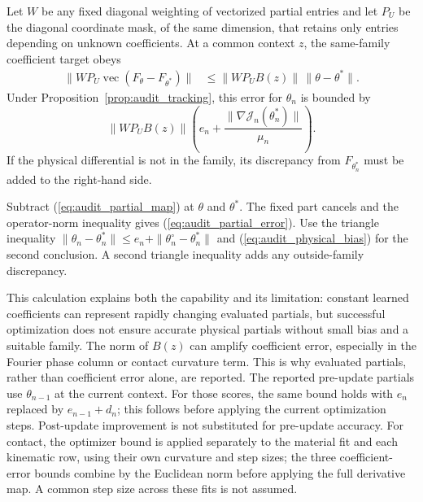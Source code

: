 \begin{auditproposition}
\label{prop:audit_partial_error}
Let $W$ be any fixed diagonal weighting of vectorized partial entries and
let $P_U$ be the diagonal coordinate mask, of the same dimension,
that retains only entries depending on unknown coefficients.
At a common context $z$, the same-family coefficient target obeys
\begin{align}
 \|WP_U\operatorname{vec}(F_\theta-F_{\theta^*})\|
 &\le\|WP_UB(z)\|\,\|\theta-\theta^*\|.\label{eq:audit_partial_error}
\end{align}
Under Proposition~\ref{prop:audit_tracking}, this error for $\theta_n$
is bounded by
\begin{equation}
 \|WP_UB(z)\|
 \left(e_n+\frac{\|\nabla\mathcal J_n(\theta_n^*)\|}{\mu_n}\right).
 \label{eq:audit_partial_tracking}
\end{equation}
If the physical differential is not in the family, its discrepancy from
$F_{\theta_n^*}$ must be added to the right-hand side.
\end{auditproposition}
\begin{IEEEproof}
Subtract (\ref{eq:audit_partial_map}) at $\theta$ and $\theta^*$.
The fixed part cancels and the operator-norm inequality gives
(\ref{eq:audit_partial_error}). Use the triangle inequality
$\|\theta_n-\theta_n^*\|\le e_n+
\|\theta_n^\circ-\theta_n^*\|$ and
(\ref{eq:audit_physical_bias}) for the second conclusion. A second
triangle inequality adds any outside-family discrepancy.
\end{IEEEproof}
This calculation explains both the capability and its limitation:
constant learned coefficients can represent rapidly changing evaluated
partials, but successful optimization does not ensure accurate physical
partials without small bias and a suitable family. The norm of $B(z)$
can amplify coefficient error, especially in the Fourier phase column
or contact curvature term. This is why evaluated partials, rather than
coefficient error alone, are reported.
The reported pre-update partials use $\theta_{n-1}$ at the current context.
For those scores, the same bound holds with $e_n$ replaced by
$e_{n-1}+d_n$; this follows before applying the current optimization
steps. Post-update improvement is not substituted for pre-update accuracy.
For contact, the optimizer bound is applied separately to the material
fit and each kinematic row, using their own curvature and step sizes;
the three coefficient-error bounds combine by the Euclidean norm before
applying the full derivative map. A common step size across these fits
is not assumed.

